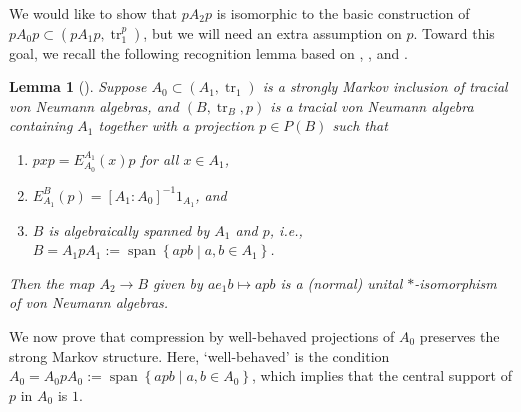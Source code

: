 \documentclass[11pt]{article}
\theoremstyle{plain}
\newtheorem{lem}[thm]{Lemma}
\theoremstyle{definition}
\DeclareMathOperator{\spann}{span}
\DeclareMathOperator{\tr}{tr}
\newcommand{\set}[2]{\left\{#1 \middle| #2\right\}}
\begin{document}
We would like to show that $pA_2p$ is isomorphic to the basic construction of $pA_0p \subset (pA_1p, \tr_1^p)$, but we will need an extra assumption on $p$.
Toward this goal, we recall the following recognition lemma based on \cite[Prop.~1.2]{MR965748}, \cite[Lem.~5.8]{MR1073519}, and \cite[Lem.~5.3.1]{MR1473221}.

\begin{lem}[{\cite[Lem.~2.15]{MR2812459}}]
\label{lem:BasicConstructionRecognition}
Suppose $A_0 \subset (A_1, \tr_1)$ is a strongly Markov inclusion of tracial von Neumann algebras, and $(B, \tr_B, p)$ is a tracial von Neumann algebra containing $A_1$ together with a projection $p\in P(B)$ such that
\begin{enumerate}[(1)]
\item
$pxp = E_{A_0}^{A_1}(x)p$ for all $x\in A_1$,
\item
$E^{B}_{A_1}(p) = [A_1:A_0]^{-1} 1_{A_1}$, and
\item
$B$ is algebraically spanned by $A_1$ and $p$, i.e., $B = A_1pA_1 := \spann\set{apb}{a,b\in A_1}$.
\end{enumerate}
Then the map $A_2\to B$ given by $ae_1b \mapsto apb$ is a (normal) unital $*$-isomorphism of von Neumann algebras.
\end{lem}

We now prove that compression by well-behaved projections of $A_0$ preserves the strong Markov structure.
Here, `well-behaved' is the condition 
$A_0 = A_0 p A_0 := \spann\set{apb}{a,b\in A_0}$,
which implies that the central support of $p$ in $A_0$ is $1$.
\end{document}
